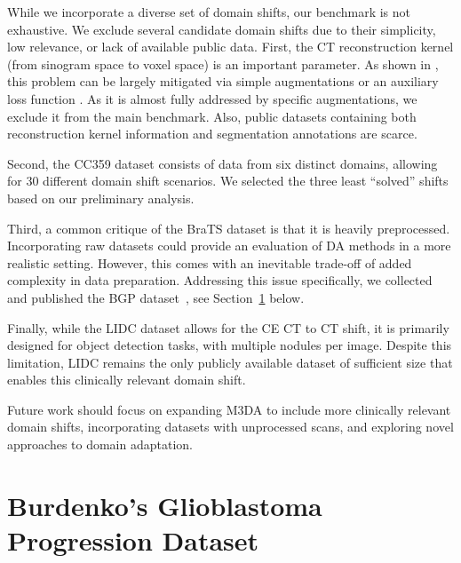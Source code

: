 While we incorporate a diverse set of domain shifts, our benchmark is not exhaustive. We exclude several candidate domain shifts due to their simplicity, low relevance, or lack of available public data. First, the CT reconstruction kernel (from sinogram space to voxel space) is an important parameter. As shown in \cite{fbpaug}, this problem can be largely mitigated via simple augmentations or an auxiliary loss function \cite{shimovolos2022adaptation}. As it is almost fully addressed by specific augmentations, we exclude it from the main benchmark. Also, public datasets containing both reconstruction kernel information and segmentation annotations are scarce.

Second, the CC359 dataset consists of data from six distinct domains, allowing for 30 different domain shift scenarios. We selected the three least ``solved'' shifts based on our preliminary analysis.%

Third, a common critique of the BraTS dataset is that it is heavily preprocessed. Incorporating raw datasets could provide an evaluation of DA methods in a more realistic setting. However, this comes with an inevitable trade-off of added complexity in data preparation. Addressing this issue specifically, we collected and published the BGP dataset~\cite{Zolotova2023Burdenko}, see Section~\ref{sec:da_bench:bgpd} below.


Finally, while the LIDC dataset allows for the CE CT to CT shift, it is primarily designed for object detection tasks, with multiple nodules per image. Despite this limitation, LIDC remains the only publicly available dataset of sufficient size that enables this clinically relevant domain shift.

Future work should focus on expanding M3DA to include more clinically relevant domain shifts, incorporating datasets with unprocessed scans, and exploring novel approaches to domain adaptation.


\section{Burdenko's Glioblastoma Progression Dataset}
\label{sec:da_bench:bgpd}

